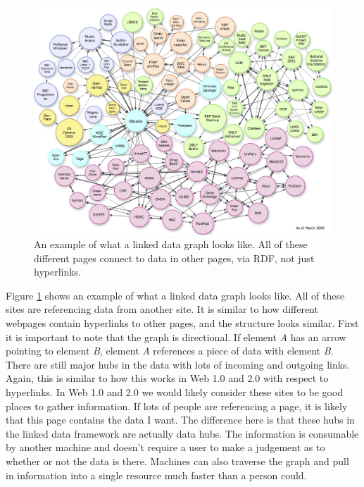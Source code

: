 \documentclass[12pt]{article}
\begin{document}
\begin{figure}[H]
  \begin{center}
    \includegraphics[scale=0.2]{web3_graph.jpg}
    \caption{An example of what a linked data graph looks like.  All of these different pages connect to data in other pages, via RDF, not just hyperlinks.}
    \label{fig:web3_graph}
  \end{center}
\end{figure}

Figure \ref{fig:web3_graph} shows an example of what a linked data graph looks like.  All of these sites are referencing data from another site.  It is similar to how different webpages contain hyperlinks to other pages, and the structure looks similar.  First it is important to note that the graph is directional.  If element \textit{A} has an arrow pointing to element \textit{B}, element \textit{A} references a piece of data with element \textit{B}.  There are still major hubs in the data with lots of incoming and outgoing links.  Again, this is similar to how this works in Web 1.0 and 2.0 with respect to hyperlinks.  In Web 1.0 and 2.0 we would likely consider these sites to be good places to gather information.  If lots of people are referencing a page, it is likely that this page contains the data I want.  The difference here is that these hubs in the linked data framework are actually data hubs.  The information is consumable by another machine and doesn't require a user to make a judgement as to whether or not the data is there.  Machines can also traverse the graph and pull in information into a single resource much faster than a person could.
\end{document}
